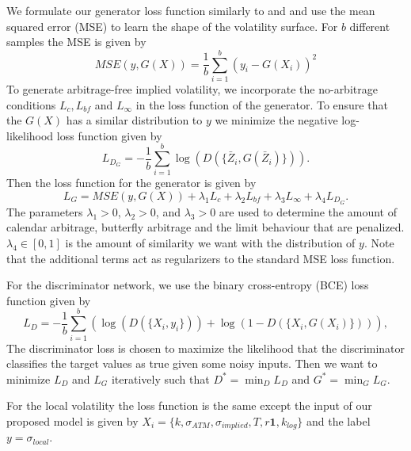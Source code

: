 \documentclass{article}
\theoremstyle{plain}%
\theoremstyle{definition}
\theoremstyle{remark}
\begin{document}
We formulate our generator loss function similarly to \citep{horvath-2021} and \citep{ackerer-2020} and use the mean squared error (MSE) to learn the shape of the volatility surface. For $b$ different samples the MSE is given by
\begin{equation}
    MSE(y, G(X)) = \frac{1}{b}\sum_{i = 1}^{b} (y_i - G(X_i))^2
\label{eq:rmse}
\end{equation}
To generate arbitrage-free implied volatility, we incorporate the no-arbitrage conditions $L_c, L_{bf}$ and $L_\infty$ in the loss function of the generator. To ensure that the $G(X)$ has a similar distribution to $y$ we minimize the negative log-likelihood loss function given by
\begin{equation*}
    L_{D_G} = -\frac{1}{b} \sum_{i = 1}^b \log(D(\{\bar{Z}_i,G(\bar{Z}_i)\})).
\end{equation*}
Then the loss function for the generator is given by
\begin{equation}
    L_G = MSE(y, G(X)) + \lambda_1 L_c + \lambda_2 L_{bf} + \lambda_3 L_\infty + \lambda_4 L_{D_G}.
\label{eq:generator_loss}
\end{equation}
The parameters $\lambda_1 > 0$, $\lambda_2 > 0$, and $\lambda_3 > 0$ are used to determine the amount of calendar arbitrage, butterfly arbitrage and the limit behaviour that are penalized. $\lambda_4 \in [0,1]$ is the amount of similarity we want with the distribution of $y$. Note that the additional terms act as regularizers to the standard MSE loss function. 

For the discriminator network, we use the binary cross-entropy (BCE) loss function \citep{goodfellow-2016} given by
\begin{equation}
    L_{D}= -\frac{1}{b} \sum_{i = 1}^b \left(\log(D(\{X_i,y_i\}))  + \log (1-D(\{X_i,G(X_i)\}))\right),
\label{eq:bce}
\end{equation}
The discriminator loss is chosen to maximize the likelihood that the discriminator classifies the target values as true given some noisy inputs. Then we want to minimize $L_D$ and $L_G$ iteratively such that $D^* = \min_D L_D$ and $G^* = \min_G L_G$. 

For the local volatility the loss function is the same except the input of our proposed model is given by $X_i =\{k,\sigma_{ATM},\sigma_{implied},T,r\mathbf{1},k_{log}\}$ and the label $y = \sigma_{local}$.
\end{document}
